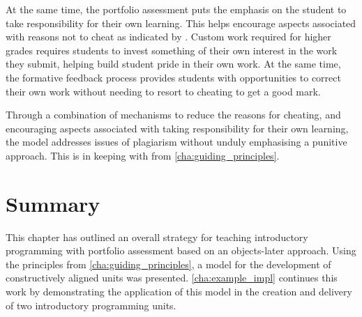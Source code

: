 At the same time, the portfolio assessment puts the emphasis on the student to take responsibility for their own learning. This helps encourage aspects associated with reasons not to cheat as indicated by \citet{Sheard:2003}. Custom work required for higher grades requires students to invest something of their own interest in the work they submit, helping build student pride in their own work. At the same time, the formative feedback process provides students with opportunities to correct their own work without needing to resort to cheating to get a good mark.

Through a combination of mechanisms to reduce the reasons for cheating, and encouraging aspects associated with taking responsibility for their own learning, the model addresses issues of plagiarism without unduly emphasising a punitive approach. This is in keeping with  from \cref{cha:guiding_principles}.


\section{Summary} %
\label{sec:ca_summary}


%
%

This chapter has outlined an overall strategy for teaching introductory programming with portfolio assessment based on an objects-later approach. Using the principles from \cref{cha:guiding_principles}, a model for the development of constructively aligned units was presented. \cref{cha:example_impl} continues this work by demonstrating the application of this model in the creation and delivery of two introductory programming units.


